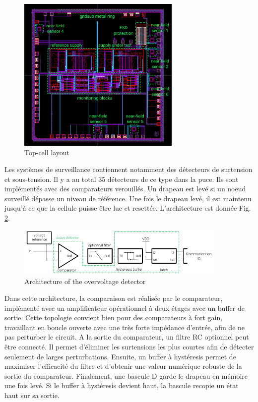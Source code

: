 \begin{figure}[!h]
  \centering
  \includegraphics[width=0.7\textwidth]{src/1/figures/topcell_layout.pdf}
  \caption{Top-cell layout}
  \label{fig:top-cell-layout}
\end{figure}

Les systèmes de surveillance contiennent notamment des détecteurs de surtension et sous-tension.
Il y a au total 35 détecteurs de ce type dans la puce.
Ils sont implémentés avec des comparateurs verouillés.
Un drapeau est levé si un noeud surveillé dépasse un niveau de référence.
Une fois le drapeau levé, il est maintenu jusqu'à ce que la cellule puisse être lue et resettée.
L'architecture est donnée Fig. \ref{fig:architecture-ov}.

\begin{figure}[!h]
  \centering
  \includegraphics[width=0.9\textwidth]{src/1/figures/architecture_OV.pdf}
  \caption{Architecture of the overvoltage detector}
  \label{fig:architecture-ov}
\end{figure}

Dans cette architecture, la comparaison est réalisée par le comparateur, implémenté avec un amplificateur opérationnel à deux étages avec un buffer de sortie.
Cette topologie convient bien pour des comparateurs à fort gain, travaillant en boucle ouverte avec une très forte impédance d'entrée, afin de ne pas perturber le circuit.
A la sortie du comparateur, un filtre RC optionnel peut être connecté.
Il permet d'éliminer les surtensions les plus courtes afin de détecter seulement de larges perturbations.
Ensuite, un buffer à hystéresis permet de maximiser l'efficacité du filtre et d'obtenir une valeur numérique robuste de la sortie du comparateur.
Finalement, une bascule D garde le drapeau en mémoire une fois levé.
Si le buffer à hystéresis devient haut, la bascule recopie un état haut sur sa sortie.

